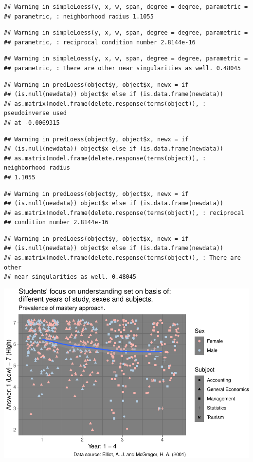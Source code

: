 \documentclass[]{article}
\begin{document}
\begin{verbatim}
## Warning in simpleLoess(y, x, w, span, degree = degree, parametric =
## parametric, : neighborhood radius 1.1055
\end{verbatim}

\begin{verbatim}
## Warning in simpleLoess(y, x, w, span, degree = degree, parametric =
## parametric, : reciprocal condition number 2.8144e-16
\end{verbatim}

\begin{verbatim}
## Warning in simpleLoess(y, x, w, span, degree = degree, parametric =
## parametric, : There are other near singularities as well. 0.48045
\end{verbatim}

\begin{verbatim}
## Warning in predLoess(object$y, object$x, newx = if
## (is.null(newdata)) object$x else if (is.data.frame(newdata))
## as.matrix(model.frame(delete.response(terms(object)), : pseudoinverse used
## at -0.0069315
\end{verbatim}

\begin{verbatim}
## Warning in predLoess(object$y, object$x, newx = if
## (is.null(newdata)) object$x else if (is.data.frame(newdata))
## as.matrix(model.frame(delete.response(terms(object)), : neighborhood radius
## 1.1055
\end{verbatim}

\begin{verbatim}
## Warning in predLoess(object$y, object$x, newx = if
## (is.null(newdata)) object$x else if (is.data.frame(newdata))
## as.matrix(model.frame(delete.response(terms(object)), : reciprocal
## condition number 2.8144e-16
\end{verbatim}

\begin{verbatim}
## Warning in predLoess(object$y, object$x, newx = if
## (is.null(newdata)) object$x else if (is.data.frame(newdata))
## as.matrix(model.frame(delete.response(terms(object)), : There are other
## near singularities as well. 0.48045
\end{verbatim}

\includegraphics{StudentGoals_files/figure-latex/unnamed-chunk-15-1.pdf}
\end{document}
